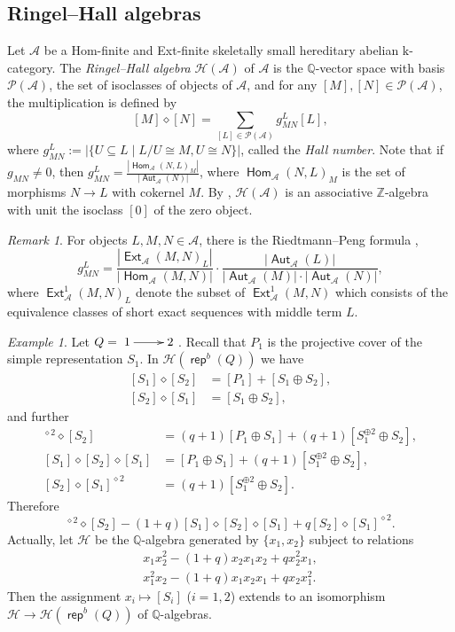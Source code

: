 \documentclass[reqno,12pt,a4paper]{amsart}
\theoremstyle{remark}
\newtheorem{remark}[theorem]{Remark}
\newtheorem{example}[theorem]{Example}
\theoremstyle{definition}
\newcommand{\opname}[1]{\operatorname{\mathsf{#1}}}
\newcommand{\rep}{\opname{rep}\nolimits}
\newcommand{\Hom}{\opname{Hom}}
\newcommand{\Aut}{\opname{Aut}}
\newcommand{\Ext}{\opname{Ext}}
\newcommand{\ca}{{\mathcal A}}
\newcommand{\ch}{{\mathcal H}}
\newcommand{\cp}{{\mathcal P}}
\newcommand{\fk}{{\mathrm k}}
\numberwithin{equation}{section}
\begin{document}
\subsection{Ringel--Hall algebras}\label{ss:Ringel-Hall-algebra}
Let $\mathcal{A}$ be a Hom-finite and Ext-finite skeletally small hereditary abelian $\fk$-category.
The \emph{Ringel--Hall algebra} $\mathcal{H(A)}$ of $\mathcal{A}$ is the  $\mathbb{Q}$-vector space with basis $\mathcal{P(A)}$, the set of isoclasses of objects of $\ca$, and for any $[M], [N]\in \mathcal{P(A)}$, the multiplication is defined by
\[[M]\diamond [N]=\sum_{[L]\in\cp(\ca)}g_{MN}^L [L],\]
where $g_{MN}^L:=|\{U\subseteq L\mid L/U\cong M, U\cong N\}|$, called the \emph{Hall number}. Note that if $g_{MN}\neq 0$, then $g_{MN}^L=\frac{|\Hom_\ca(N,L)_M|}{|\Aut_\ca(N)|}$, where $\Hom_\ca(N,L)_M$ is the set of morphisms $N\to L$ with cokernel $M$. By \cite{Ringel90}, $\mathcal{H(A)}$ is an associative $\mathbb{Z}$-algebra with unit the isoclass $[0]$ of the zero object.

\begin{remark}
For objects $L,M,N\in \mathcal{A}$, there is the Riedtmann--Peng formula \cite{Riedtmann94,Peng97},
\[g_{MN}^L=\frac{|\Ext_{\mathcal{A}}(M,N)_L|}{|\Hom_{\mathcal{A}}(M,N)|}\cdot \frac{|\Aut_\ca (L)|}{|\Aut_\ca(M)|\cdot|\Aut_\ca(N)|},\]
where $\Ext^{1}_{\mathcal{A}}(M,N)_L$ denote the subset of $\Ext^{1}_{\mathcal{A}}(M,N)$ which consists of the equivalence classes of short exact sequences with middle term $L$.
\end{remark}

\begin{example}
Let $Q=\xymatrix{1\ar[r]&2}$. Recall that $P_1$ is the projective cover of the simple representation $S_1$. In $\mathcal{H}(\rep^b(Q))$ we have
\begin{align*}
  {[S_1]\diamond [S_2]} &= {[P_1]+[S_1\oplus S_2]}, \\
  {[S_2]\diamond [S_1]} &= [S_1\oplus S_2],
\end{align*}
and further
\begin{align*}
[S_1]^{\diamond 2}\diamond [S_2] &= (q+1)[P_1\oplus S_1]+(q+1)[S_1^{\oplus 2}\oplus S_2],\\
[S_1]\diamond [S_2]\diamond [S_1] &= [P_1\oplus S_1] +(q+1)[S_1^{\oplus 2}\oplus S_2],\\
[S_2]\diamond [S_1]^{\diamond 2} &= (q+1)[S_1^{\oplus 2}\oplus S_2].
\end{align*}
Therefore
  \begin{equation*}
   [S_1]^{\diamond2}\diamond[S_{2}]-(1+q)[S_1]\diamond[S_{2}]\diamond[S_1]+q[S_{2}]\diamond[S_1]^{\diamond2}.
  \end{equation*}
Actually, let $\ch$ be the $\mathbb{Q}$-algebra generated by $\{x_1, x_2\}$ subject to relations
\begin{align*}
    x_1x_2^2-(1+q)x_2 x_1x_2+qx_2^2x_1,\\
   x_1^2 x_2-(1+q) x_1 x_2 x_1+qx_2x_1^2.
  \end{align*}
Then the assignment $x_i\mapsto [S_i]$ ($i=1,2$) extends to an isomorphism $\ch\to\ch(\rep^b(Q))$ of $\mathbb{Q}$-algebras.
\end{example}
\end{document}

